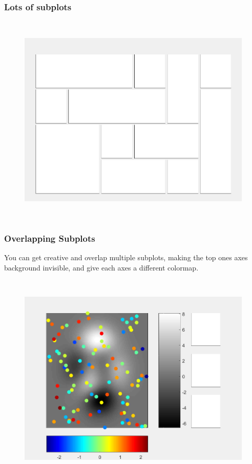 \documentclass{article}
\begin{document}
	\clearpage
	\subsubsection*{Lots of subplots}
	
	
	
	\begin{figure}[H]
		\centering
		\includegraphics[height = 4in]{axgridex3}
	\end{figure}
	
	\clearpage
	\subsubsection*{Overlapping Subplots}
	You can get creative and overlap multiple subplots, making the top ones axes background invisible, and give each axes a different colormap.
	
	
	\begin{figure}[H]
		\centering
		\includegraphics[height = 4in]{axgridex4}
	\end{figure}
\end{document}
